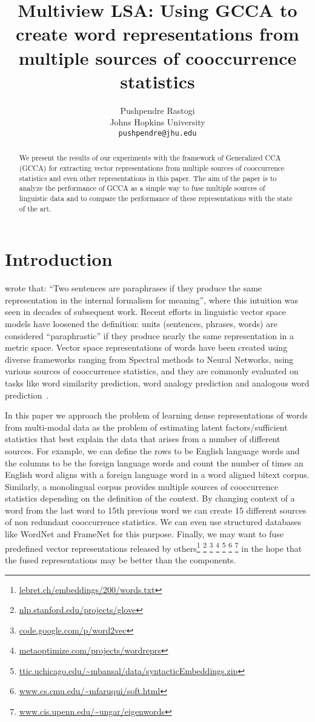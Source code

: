 \documentclass[11pt]{article}
\title{Multiview LSA: Using GCCA to create word
  representations from multiple sources of cooccurrence statistics}
\author{Pushpendre Rastogi \\
  Johns Hopkins University \\
  {\tt pushpendre@jhu.edu} 
}
\date{}
\begin{document}
\maketitle
\begin{abstract}
  We present the  results of our experiments with
  the framework of Generalized CCA (GCCA) for extracting vector
  representations from multiple sources of cooccurrence statistics and
  even other representations in this paper. 
  The aim of the paper is to analyze the performance of GCCA as a
  simple way to fuse multiple sources of linguistic
  data and to compare the performance of these representations with
  the state of the art.
\end{abstract}

\section{Introduction}
\cite{winograd1972understanding} wrote that: ``Two sentences are paraphrases if they
produce the same representation in the internal formalism for
meaning'', where this intuition was seen in decades of subsequent work.
Recent efforts in linguistic vector space models have loosened the
definition: units (sentences, phrases, words) are considered
``paraphrastic'' if they produce nearly the same representation in a
metric space.
Vector space representations of words have been created using diverse
 frameworks ranging from Spectral methods to Neural Networks, using various sources of
 cooccurrence statistics, and they are commonly evaluated on tasks
 like word similarity prediction, word analogy prediction and
 analogous word
 prediction~\cite{dhillon2011multi,dhillon2012two,mikolov2013efficient,mikolov2013distributed,collobert2013word,zou2013bilingual,faruqui2014improving,pennington2014glove,bansal2014tailoring,levy2014dependency,felix2014learning}.

In this paper we approach the problem of learning dense
representations of words from multi-modal data as the
problem of estimating latent factors/sufficient statistics that best
explain the
data that arises from a number of different
sources. For example, we can define the rows to be English language words
and the columns to be the foreign language words and
count the number of times an English word aligns with a
foreign language word in a word aligned bitext corpus. Similarly,
a monolingual corpus provides multiple sources of 
cooccurrence statistics depending on the definition of the
context. By changing context of a word from the last word to 15th
previous word we can
create 15 different sources of non redundant cooccurrence
statistics. We can even use structured databases like WordNet and
FrameNet for this purpose. Finally, we may want to fuse predefined vector
representations released by others\footnote{\url{lebret.ch/embeddings/200/words.txt}}
  \footnote{\url{nlp.stanford.edu/projects/glove}}
  \footnote{\url{code.google.com/p/word2vec}}
  \footnote{\url{metaoptimize.com/projects/wordreprs}}
  \footnote{\url{ttic.uchicago.edu/~mbansal/data/syntacticEmbeddings.zip}}
  \footnote{\url{www.cs.cmu.edu/~mfaruqui/soft.html}}
  \footnote{\url{www.cis.upenn.edu/~ungar/eigenwords}}
  in the hope that the fused representations may be better
than the components.
\end{document}
